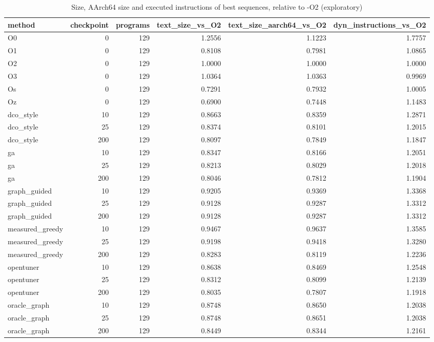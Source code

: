 \begin{table}[t]
\centering
\caption{Size, AArch64 size and executed instructions of best sequences, relative to -O2 (exploratory)}
\label{tab:v3-1-measured-vs-O2}
\begin{tabular}{lrrrrr}
\toprule
method & checkpoint & programs & text\_size\_vs\_O2 & text\_size\_aarch64\_vs\_O2 & dyn\_instructions\_vs\_O2 \\
\midrule
O0 & 0 & 129 & 1.2556 & 1.1223 & 1.7757 \\
O1 & 0 & 129 & 0.8108 & 0.7981 & 1.0865 \\
O2 & 0 & 129 & 1.0000 & 1.0000 & 1.0000 \\
O3 & 0 & 129 & 1.0364 & 1.0363 & 0.9969 \\
Os & 0 & 129 & 0.7291 & 0.7932 & 1.0005 \\
Oz & 0 & 129 & 0.6900 & 0.7448 & 1.1483 \\
dco\_style & 10 & 129 & 0.8663 & 0.8359 & 1.2871 \\
dco\_style & 25 & 129 & 0.8374 & 0.8101 & 1.2015 \\
dco\_style & 200 & 129 & 0.8097 & 0.7849 & 1.1847 \\
ga & 10 & 129 & 0.8347 & 0.8166 & 1.2051 \\
ga & 25 & 129 & 0.8213 & 0.8029 & 1.2018 \\
ga & 200 & 129 & 0.8046 & 0.7812 & 1.1904 \\
graph\_guided & 10 & 129 & 0.9205 & 0.9369 & 1.3368 \\
graph\_guided & 25 & 129 & 0.9128 & 0.9287 & 1.3312 \\
graph\_guided & 200 & 129 & 0.9128 & 0.9287 & 1.3312 \\
measured\_greedy & 10 & 129 & 0.9467 & 0.9637 & 1.3585 \\
measured\_greedy & 25 & 129 & 0.9198 & 0.9418 & 1.3280 \\
measured\_greedy & 200 & 129 & 0.8283 & 0.8119 & 1.2236 \\
opentuner & 10 & 129 & 0.8638 & 0.8469 & 1.2548 \\
opentuner & 25 & 129 & 0.8312 & 0.8099 & 1.2139 \\
opentuner & 200 & 129 & 0.8035 & 0.7807 & 1.1918 \\
oracle\_graph & 10 & 129 & 0.8748 & 0.8650 & 1.2038 \\
oracle\_graph & 25 & 129 & 0.8748 & 0.8651 & 1.2038 \\
oracle\_graph & 200 & 129 & 0.8449 & 0.8344 & 1.2161 \\

\end{tabular}
\end{table}
